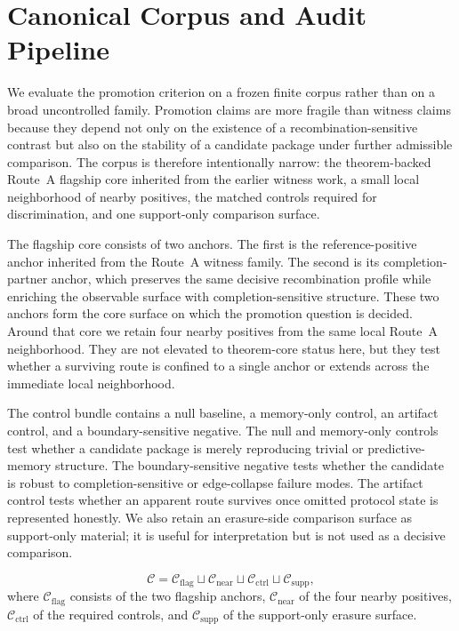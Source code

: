\documentclass[11pt]{article}
\theoremstyle{definition}
\begin{document}
 \section{Canonical Corpus and Audit Pipeline}\label{sec:methods-core}

We evaluate the promotion criterion on a frozen finite corpus rather than on a broad uncontrolled family. Promotion claims are more fragile than witness claims because they depend not only on the existence of a recombination-sensitive contrast but also on the stability of a candidate package under further admissible comparison. The corpus is therefore intentionally narrow: the theorem-backed Route~A flagship core inherited from the earlier witness work, a small local neighborhood of nearby positives, the matched controls required for discrimination, and one support-only comparison surface.

The flagship core consists of two anchors. The first is the reference-positive anchor inherited from the Route~A witness family. The second is its completion-partner anchor, which preserves the same decisive recombination profile while enriching the observable surface with completion-sensitive structure. These two anchors form the core surface on which the promotion question is decided. Around that core we retain four nearby positives from the same local Route~A neighborhood. They are not elevated to theorem-core status here, but they test whether a surviving route is confined to a single anchor or extends across the immediate local neighborhood.

The control bundle contains a null baseline, a memory-only control, an artifact control, and a boundary-sensitive negative. The null and memory-only controls test whether a candidate package is merely reproducing trivial or predictive-memory structure. The boundary-sensitive negative tests whether the candidate is robust to completion-sensitive or edge-collapse failure modes. The artifact control tests whether an apparent route survives once omitted protocol state is represented honestly. We also retain an erasure-side comparison surface as support-only material; it is useful for interpretation but is not used as a decisive comparison.

\[
\mathcal C
=
\mathcal C_{\mathrm{flag}}
\sqcup
\mathcal C_{\mathrm{near}}
\sqcup
\mathcal C_{\mathrm{ctrl}}
\sqcup
\mathcal C_{\mathrm{supp}},
\]
where $\mathcal C_{\mathrm{flag}}$ consists of the two flagship anchors, $\mathcal C_{\mathrm{near}}$ of the four nearby positives, $\mathcal C_{\mathrm{ctrl}}$ of the required controls, and $\mathcal C_{\mathrm{supp}}$ of the support-only erasure surface.
\end{document}
